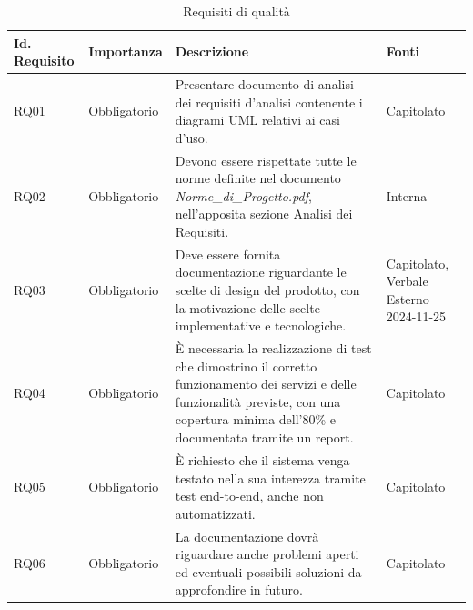 \documentclass[11pt]{article}
\begin{document}
\begin{justify}
\begin{table}[H]
\centering
\renewcommand{\arraystretch}{1.5}
\begin{tabular}{|>{\centering\arraybackslash}m{2.7cm}|>{\centering\arraybackslash}m{2.7cm}|>{\centering\arraybackslash}m{6cm}|>{\centering\arraybackslash}m{2.1cm}|}
\hline
\textbf{Id. Requisito} & \textbf{Importanza} & \textbf{Descrizione} & \textbf{Fonti}\\
\hline
RQ01 & Obbligatorio & Presentare documento di analisi dei requisiti d'analisi contenente i diagrami UML relativi ai casi d'uso. & Capitolato\\
\hline
RQ02 & Obbligatorio & Devono essere rispettate tutte le norme definite nel documento \textit{Norme\_di\_Progetto.pdf}, nell'apposita sezione Analisi dei Requisiti. & Interna\\
\hline
RQ03 & Obbligatorio & Deve essere fornita documentazione riguardante le scelte di design del prodotto, con la motivazione delle scelte implementative e tecnologiche. & Capitolato, Verbale Esterno 2024-11-25\\
\hline
RQ04 & Obbligatorio & È necessaria la realizzazione di test che dimostrino il corretto funzionamento dei servizi e delle funzionalità previste, con una copertura minima dell'80\% e documentata tramite un report.  & Capitolato\\
\hline
RQ05 & Obbligatorio & È richiesto che il sistema venga testato nella sua interezza tramite test end-to-end, anche non automatizzati.  & Capitolato\\
\hline
RQ06 & Obbligatorio & La documentazione dovrà riguardare anche problemi aperti ed eventuali possibili soluzioni da approfondire in futuro.  & Capitolato\\
\hline
\end{tabular}
\caption{Requisiti di qualità}
\end{table}

\newpage

\end{justify}
\end{document}
